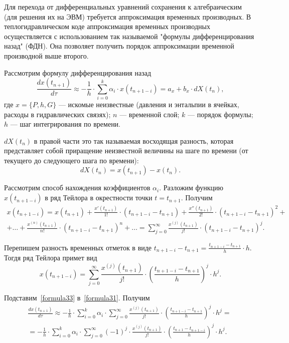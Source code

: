 
Для перехода от дифференциальных уравнений сохранения к алгебраическим (для решения их на ЭВМ) требуется аппроксимация временных производных.
В теплогидравлическом коде аппроксимация временных производных осуществляется с использованием так называемой "формулы дифференцирования назад" (ФДН). Она позволяет получить порядок аппроксимации временной производной выше второго. 

Рассмотрим формулу дифференцирования назад
\begin{equation}
\label{formula31}
\frac{dx(t_{n+1})}{d\tau}\approx -\frac 1 h\cdot \sum_{i=0}^{k}\alpha_i\cdot x(t_{n+1-i})=a_x+b_x\cdot dX(t_n),
\end{equation} 
где $x=\{P,h,G\}$ --- искомые неизвестные (давления и энтальпии в ячейках, расходы в гидравлических связях); $n$ --- временной слой; $k$ --- порядок формулы; $h$ --- шаг интегрирования по времени.

$dX(t_n)$ в правой части это так называемая восходящая разность, которая представляет собой приращение неизвестной величины на шаге по времени (от текущего до следующего шага по времени):
$$dX(t_n)=x(t_{n+1})-x(t_n).$$

Рассмотрим способ нахождения коэффициентов $\alpha_i$. Разложим функцию $x(t_{n+1-i})$ в ряд Тейлора в окрестности точки $t=t_{n+1}$. Получим
\begin{eqnarray}
\label{formula32}
x(t_{n+1-i})=x(t_{n+1})+\frac{x'(t_{n+1})}{1!}\cdot (t_{n+1-i}-t_{n+1}) + \frac{x''(t_{n+1})}{2!}\cdot (t_{n+1-i}-t_{n+1})^2  + \nonumber ~\\
+\dots+\frac{x^{(n)}(t_{n+1})}{n!}\cdot (t_{n+1-i}-t_{n+1})^n+\dots=\sum_{j=0}^{\infty}\frac{x^{(j)}(t_{n+1})}{j!}\cdot (t_{n+1-i}-t_{n+1})^j.
\end{eqnarray}

Перепишем разность временных отметок в виде $t_{n+1-i}-t_{n+1}=\frac{t_{n+1-i}-t_{n+1}}{h}\cdot h$. Тогдя ряд Тейлора примет вид
\begin{equation}
\label{formula33}
x(t_{n+1-i})=\sum_{j=0}^{\infty}\frac{x^{(j)}(t_{n+1})}{j!}\cdot \left(\frac{t_{n+1-i}-t_{n+1}}{h}\right)^j\cdot h^j.
\end{equation}

Подставим~\eqref{formula33} в~\eqref{formula31}. Получим
\begin{eqnarray}
\label{formula34}
\frac{dx(t_{n+1})}{d\tau}\approx -\frac 1 h\cdot \sum_{i=0}^{k}\alpha_i\cdot \sum_{j=0}^{\infty}\frac{x^{(j)}(t_{n+1})}{j!}\cdot \left(\frac{t_{n+1-i}-t_{n+1}}{h}\right)^j\cdot h^j = \nonumber ~\\
= -\frac 1 h\cdot \sum_{i=0}^{k}\alpha_i\cdot \sum_{j=0}^{\infty}(-1)^j \cdot\frac{x^{(j)}(t_{n+1})}{j!}\cdot \left(\frac{t_{n+1}-t_{n+1-i}}{h}\right)^j\cdot h^j.
\end{eqnarray}

